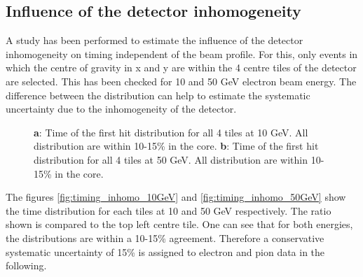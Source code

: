 \subsection{Influence of the detector inhomogeneity}
\label{subsec:det_inhomo}

A study has been performed to estimate the influence of the detector inhomogeneity on timing independent of the beam profile. For this, only events in which the centre of gravity in x and y are within the 4 centre tiles of the detector are selected. This has been checked for 10 and 50 GeV electron beam energy. The difference between the distribution can help to estimate the systematic uncertainty due to the inhomogeneity of the detector.
\begin{figure}[htbp]
	\hfill
	\caption[]{\textbf{a}: Time of the first hit distribution for all 4 tiles at 10 GeV. All distribution are within 10-15\% in the core. \textbf{b}: Time of the first hit distribution for all 4 tiles at 50 GeV. All distribution are within 10-15\% in the core.}
\end{figure}
The figures \ref{fig:timing_inhomo_10GeV} and \ref{fig:timing_inhomo_50GeV} show the time distribution for each tiles at 10 and 50 GeV respectively. The ratio shown is compared to the top left centre tile. One can see that for both energies, the distributions are within a 10-15\% agreement. Therefore a conservative systematic uncertainty of 15\% is assigned to electron and pion data in the following.

